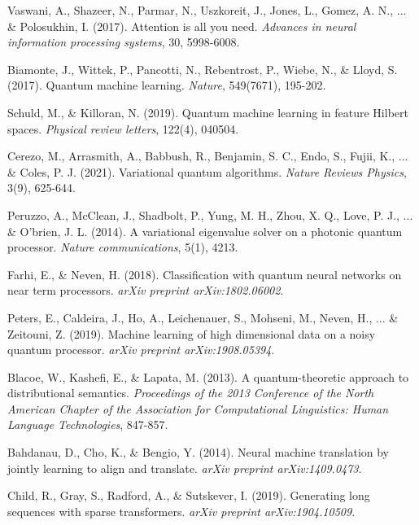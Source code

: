 \documentclass[11pt,twocolumn]{article}
\begin{document}
\begin{thebibliography}{99}

Vaswani, A., Shazeer, N., Parmar, N., Uszkoreit, J., Jones, L., Gomez, A. N., ... \& Polosukhin, I. (2017). Attention is all you need. \textit{Advances in neural information processing systems}, 30, 5998-6008.

Biamonte, J., Wittek, P., Pancotti, N., Rebentrost, P., Wiebe, N., \& Lloyd, S. (2017). Quantum machine learning. \textit{Nature}, 549(7671), 195-202.

Schuld, M., \& Killoran, N. (2019). Quantum machine learning in feature Hilbert spaces. \textit{Physical review letters}, 122(4), 040504.

Cerezo, M., Arrasmith, A., Babbush, R., Benjamin, S. C., Endo, S., Fujii, K., ... \& Coles, P. J. (2021). Variational quantum algorithms. \textit{Nature Reviews Physics}, 3(9), 625-644.

Peruzzo, A., McClean, J., Shadbolt, P., Yung, M. H., Zhou, X. Q., Love, P. J., ... \& O'brien, J. L. (2014). A variational eigenvalue solver on a photonic quantum processor. \textit{Nature communications}, 5(1), 4213.

Farhi, E., \& Neven, H. (2018). Classification with quantum neural networks on near term processors. \textit{arXiv preprint arXiv:1802.06002}.

Peters, E., Caldeira, J., Ho, A., Leichenauer, S., Mohseni, M., Neven, H., ... \& Zeitouni, Z. (2019). Machine learning of high dimensional data on a noisy quantum processor. \textit{arXiv preprint arXiv:1908.05394}.

Blacoe, W., Kashefi, E., \& Lapata, M. (2013). A quantum-theoretic approach to distributional semantics. \textit{Proceedings of the 2013 Conference of the North American Chapter of the Association for Computational Linguistics: Human Language Technologies}, 847-857.

Bahdanau, D., Cho, K., \& Bengio, Y. (2014). Neural machine translation by jointly learning to align and translate. \textit{arXiv preprint arXiv:1409.0473}.

Child, R., Gray, S., Radford, A., \& Sutskever, I. (2019). Generating long sequences with sparse transformers. \textit{arXiv preprint arXiv:1904.10509}.


\end{thebibliography}
\end{document}
